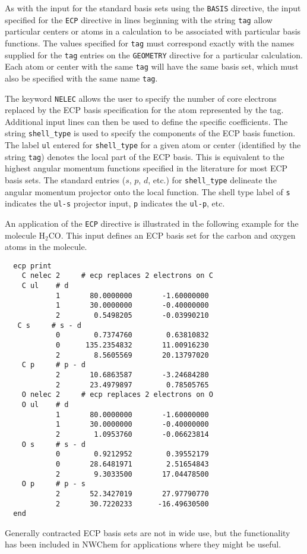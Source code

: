 As with the input for the standard basis sets using the \verb+BASIS+
directive, the input specified for the \verb+ECP+ directive in lines 
beginning with the string \verb+tag+
allow particular centers or atoms in a calculation to be associated with
particular basis functions.  The values specified for \verb+tag+
must correspond exactly with the names supplied for the \verb+tag+ entries
on the \verb+GEOMETRY+ directive for a particular calculation.  Each atom
or center with the same \verb+tag+ will have the same basis set, which must
also be specified with the same name \verb+tag+.

The keyword \verb+NELEC+ allows the user to specify the number of core 
electrons replaced by
the ECP basis specification for the atom represented by the tag.  Additional
input lines can then be used to define the specific coefficients.
The string \verb+shell_type+ is used to specify the components of the
ECP basis function.  The label \verb+ul+ entered for \verb+shell_type+
for a given atom or center (identified by the string \verb+tag+) denotes
the local part of the ECP basis.  This is equivalent to the highest 
angular momentum
functions specified in the literature for most ECP basis sets.  The
standard entries ($s$, $p$, $d$, etc.) for \verb+shell_type+ delineate 
the angular momentum projector onto the local function.  The shell type 
label of \verb+s+ indicates the \verb+ul-s+ projector input, \verb+p+ 
indicates the \verb+ul-p+, etc.

An application of the \verb+ECP+ directive is illustrated in the following 
example for the molecule  H$_2$CO.  This input defines an ECP basis set 
for the  carbon and oxygen atoms in the molecule.


\begin{verbatim}
  ecp print  
    C nelec 2     # ecp replaces 2 electrons on C
    C ul    # d
            1       80.0000000       -1.60000000
            1       30.0000000       -0.40000000
            2        0.5498205       -0.03990210
   C s     # s - d 
            0        0.7374760        0.63810832
            0      135.2354832       11.00916230
            2        8.5605569       20.13797020
    C p     # p - d
            2       10.6863587       -3.24684280
            2       23.4979897        0.78505765
    O nelec 2     # ecp replaces 2 electrons on O
    O ul    # d 
            1       80.0000000       -1.60000000
            1       30.0000000       -0.40000000
            2        1.0953760       -0.06623814
    O s     # s - d
            0        0.9212952        0.39552179
            0       28.6481971        2.51654843
            2        9.3033500       17.04478500
    O p     # p - s 
            2       52.3427019       27.97790770
            2       30.7220233      -16.49630500
  end
\end{verbatim}

Generally contracted ECP basis sets are not in wide use, but the
functionality has been included in NWChem for applications where they
might be useful. 


